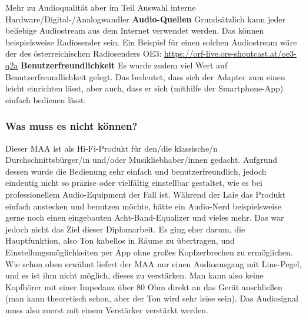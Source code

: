 \documentclass[11pt, twoside]{article}
\begin{document}
Mehr zu Audioqualität aber im Teil \glqq Auswahl interne Hardware/Digital-/Analogwandler\grqq{}
\vspace{4mm} \newline
\parencite[vgl.][]{noauthor_urlnl03_nodate}
\parencite[vgl.][]{noauthor_urlnl04_nodate}
\vspace{4mm}\newline
\textbf{Audio-Quellen}\newline
Grundsätzlich kann jeder beliebige Audiostream aus dem Internet verwendet werden. Das können beispielsweise Radiosender sein.
Ein Beispiel für einen solchen Audiostream wäre der des österreichischen Radiosenders \glqq OE3\grqq{}: \newline
\url{https://orf-live.ors-shoutcast.at/oe3-q2a}
\vspace{4mm}\newline
\textbf{Benutzerfreundlichkeit}\newline
Es wurde zudem viel Wert auf Benutzerfreundlichkeit gelegt. Das bedeutet, dass sich der Adapter zum einen leicht einrichten lässt, aber auch, dass er sich (mithilfe der Smartphone-App) einfach bedienen lässt.
\subsubsection{Was muss es nicht können?}
Dieser MAA ist als Hi-Fi-Produkt für den/die klassische/n Durchschnittsbürger/in und/oder Musikliebhaber/innen gedacht. Aufgrund dessen wurde die Bedienung sehr einfach und benutzerfreundlich, jedoch eindeutig nicht so präzise oder vielfältig einstellbar gestaltet, wie es bei professionellem Audio-Equipment der Fall ist. Während der Laie das Produkt einfach anstecken und benutzen möchte, hätte ein Audio-Nerd beispielsweise gerne noch einen eingebauten Acht-Band-Equalizer und vieles mehr. Das war jedoch nicht das Ziel dieser Diplomarbeit. Es ging eher darum, die Hauptfunktion, also Ton kabellos in Räume zu übertragen, und Einstellungsmöglichkeiten per App ohne großes Kopfzerbrechen zu ermöglichen.\newline
Wie schon oben erwähnt liefert der MAA nur einen Audioausgang mit Line-Pegel, und es ist ihm nicht möglich, dieses zu verstärken. Man kann also keine Kopfhörer mit einer Impedanz über 80 Ohm direkt an das Gerät anschließen (man kann theoretisch schon, aber der Ton wird sehr leise sein). Das Audiosignal muss also zuerst mit einem Verstärker verstärkt werden.\newline
\end{document}
